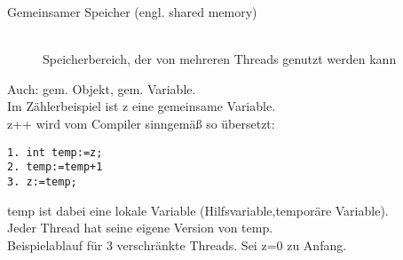 \documentclass[a4paper,12pt]{scrartcl}
\begin{document}
\begin{description}
 \item[Gemeinsamer Speicher (engl. shared memory)]\quad\\
      Speicherbereich, der von mehreren Threads genutzt werden kann
      
\end{description}

Auch: gem. Objekt, gem. Variable.\\
Im Zählerbeispiel ist z eine gemeinsame Variable.\\
z++ wird vom Compiler sinngemäß so übersetzt:
\begin{lstlisting}
1. int temp:=z;
2. temp:=temp+1
3. z:=temp;
\end{lstlisting}
temp ist dabei eine lokale Variable (\glqq{}Hilfsvariable\grqq{},\glqq{}temporäre Variable\grqq{}).\\
Jeder Thread hat seine eigene Version von temp.\\
Beispielablauf für 3 verschränkte Threads. Sei z=0 zu Anfang.\\
\end{document}
